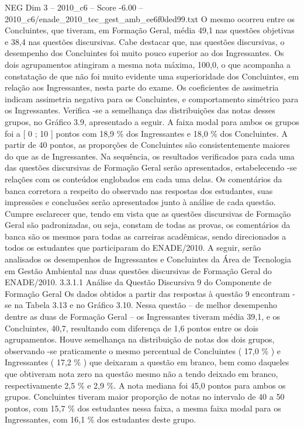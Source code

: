 \begin{textsample}{NEG Dim 3 – 2010\_c6 – Score -6.00 – 2010\_c6/enade\_2010\_tec\_gest\_amb\_ee6f0ded99.txt}
O mesmo ocorreu entre os Concluintes, que tiveram, em Formação Geral, média 49,1 nas questões objetivas e 38,4 nas questões discursivas.
Cabe destacar que, nas questões discursivas, o desempenho dos Concluintes foi muito pouco superior ao dos Ingressantes.
Os dois agrupamentos atingiram a mesma nota máxima, 100,0, o que acompanha a constatação de que não foi muito evidente uma superioridade dos Concluintes, em relação aos Ingressantes, nesta parte do exame.
Os coeficientes de assimetria indicam assimetria negativa para os Concluintes, e comportamento simétrico para os Ingressantes.
Verifica -se a semelhança das distribuições das notas desses grupos, no Gráfico 3.9, apresentado a seguir.
A faixa modal para ambos os grupos foi a [ 0 ; 10 ] pontos com 18,9 \% dos Ingressantes e 18,0 \% dos Concluintes.
A partir de 40 pontos, as proporções de Concluintes são consistentemente maiores do que as de Ingressantes.
Na sequência, os resultados verificados para cada uma das questões discursivas de Formação Geral serão apresentados, estabelecendo -se relações com os conteúdos englobados em cada uma delas.
Os comentários da banca corretora a respeito do observado nas respostas dos estudantes, suas impressões e conclusões serão apresentados junto à análise de cada questão.
Cumpre esclarecer que, tendo em vista que as questões discursivas de Formação Geral são padronizadas, ou seja, constam de todas as provas, os comentários da banca são os mesmos para todas as carreiras acadêmicas, sendo direcionados a todos os estudantes que participaram do ENADE/2010.
A seguir, serão analisados os desempenhos de Ingressantes e Concluintes da Área de Tecnologia em Gestão Ambiental nas duas questões discursivas de Formação Geral do ENADE/2010. 3.3.1.1 Análise da Questão Discursiva 9 do Componente de Formação Geral Os dados obtidos a partir das respostas à questão 9 encontram -se na Tabela 3.13 e no Gráfico 3.10.
Nessa questão – de melhor desempenho dentre as duas de Formação Geral – os Ingressantes tiveram média 39,1, e os Concluintes, 40,7, resultando com diferença de 1,6 pontos entre os dois agrupamentos.
Houve semelhança na distribuição de notas dos dois grupos, observando -se praticamente o mesmo percentual de Concluintes ( 17,0 \% ) e Ingressantes ( 17,2 \% ) que deixaram a questão em branco, bem como daqueles que obtiveram nota zero na questão mesmo não a tendo deixado em branco, respectivamente 2,5 \% e 2,9 \%.
A nota mediana foi 45,0 pontos para ambos os grupos.
Concluintes tiveram maior proporção de notas no intervalo de 40 a 50 pontos, com 15,7 \% dos estudantes nessa faixa, a mesma faixa modal para os Ingressantes, com 16,1 \% dos estudantes deste grupo.

\end{textsample}
